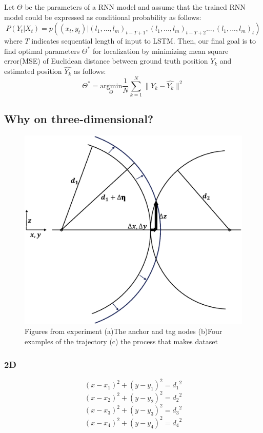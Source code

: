 \documentclass{ieeeaccess}
\begin{document}
Let $\Theta$ be the parameters of a RNN model and assume that the trained RNN model could be expressed as conditional probability as follows:
\begin{equation}
P(Y_t|X_t) = p((x_t, y_t)|(l_1,..., l_m)_{t-T+1},(l_1,..., l_m)_{t-T+2}..., (l_1,..., l_m)_t)
\end{equation}  
where $T$ indicates sequential length of input to LSTM. Then, our final goal is to find optimal parameters $\Theta^{*}$ for localization by minimizing mean square error(MSE) of Euclidean distance between ground truth position $Y_k$ and estimated position $\hat{Y_k}$ as follows:
\begin{equation}
\Theta^{*} = \underset{\Theta}{\mathrm{argmin}} \frac{1}{N} \sum_{k=1}^N \parallel Y_k - \hat{Y_k} \parallel^{2}
\end{equation}  

\subsection{Why on three-dimensional?}

\begin{figure}[h]
	\centering
	\includegraphics[width=.4\textwidth]{image/3D_error_increasing}
	\caption{Figures from experiment (a)The anchor and tag nodes (b)Four examples of the trajectory (c) the process that makes dataset}
	\label{fig:experiment}
\end{figure}


\subsubsection{2D}
\begin{equation}
(x-x_1)^2+(y-y_1)^2={d_1}^2
\end{equation}
\begin{equation}
(x-x_2)^2+(y-y_2)^2={d_2}^2
\end{equation}
\begin{equation}
(x-x_3)^2+(y-y_3)^2={d_3}^2
\end{equation}
\begin{equation}
(x-x_4)^2+(y-y_4)^2={d_4}^2
\end{equation}
\end{document}
